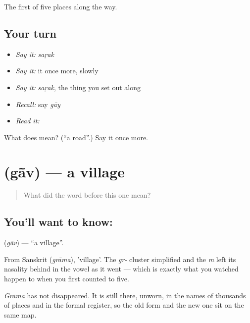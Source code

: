 \begin{grammarlens}[title={What you've built}]
The first of five places along the way.
\end{grammarlens}

\subsection*{Your turn}
\begin{itemize}
\raggedright
  \item \emph{Say it:} \emph{saṛak}
  \item \emph{Say it:} it once more, slowly
  \item \emph{Say it:} \emph{saṛak}, the thing you set out along
  \item \emph{Recall:} say \emph{gāy}
  \item \emph{Read it:} \textbf{}
\end{itemize}

\begin{tcolorbox}[breakable,colback=teal!4,colframe=teal!35!black,title={Before you move on}]
What does  mean? (\textquotedblleft{}a road\textquotedblright{}.) Say it once more.
\end{tcolorbox}
\section[\texorpdfstring{\hi{गाँव} (gā̃v)}{गाँव (gā̃v)}]{ (gā̃v) — a village}

\label{lesson:HI-C56-village}



\begin{quote}
What did the word before this one mean?
\end{quote}

\subsection*{You'll want to know: }
\textbf{} (\emph{gā̃v}) — \textquotedblleft{}a village\textquotedblright{}.

From Sanskrit  (\emph{grāma}), 'village'. The \emph{gr-} cluster simplified and the \emph{m} left its nasality behind in the vowel as it went — which is exactly what you watched happen to  when you first counted to five.

\emph{Grāma} has not disappeared. It is still there, unworn, in the names of thousands of places and in the formal register, so the old form and the new one sit on the same map.

